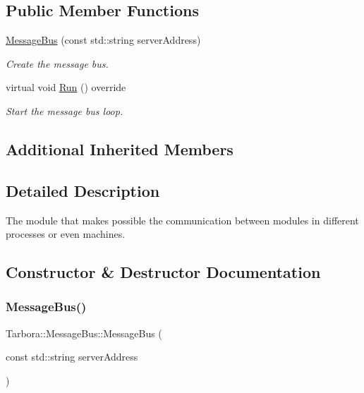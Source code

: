 \subsection*{Public Member Functions}
\begin{DoxyCompactItemize}
\item 
\hyperlink{classTarbora_1_1MessageBus_a96c5669eee45b97f3021ef0257b2590f}{Message\+Bus} (const std\+::string server\+Address)
\begin{DoxyCompactList}\small\item\em Create the message bus. \end{DoxyCompactList}\item 
virtual void \hyperlink{classTarbora_1_1MessageBus_a1de6d06fd522da0c19c4b4889a26e5dd}{Run} () override
\begin{DoxyCompactList}\small\item\em Start the message bus loop. \end{DoxyCompactList}\end{DoxyCompactItemize}
\subsection*{Additional Inherited Members}


\subsection{Detailed Description}
The module that makes possible the communication between modules in different processes or even machines. 

\subsection{Constructor \& Destructor Documentation}
\mbox{\label{classTarbora_1_1MessageBus_a96c5669eee45b97f3021ef0257b2590f}} 
\subsubsection{\texorpdfstring{Message\+Bus()}{MessageBus()}}
{\footnotesize\ttfamily Tarbora\+::\+Message\+Bus\+::\+Message\+Bus (\begin{DoxyParamCaption}\item[{const std\+::string}]{server\+Address }\end{DoxyParamCaption})\hspace{0.3cm}{\ttfamily [inline]}}



